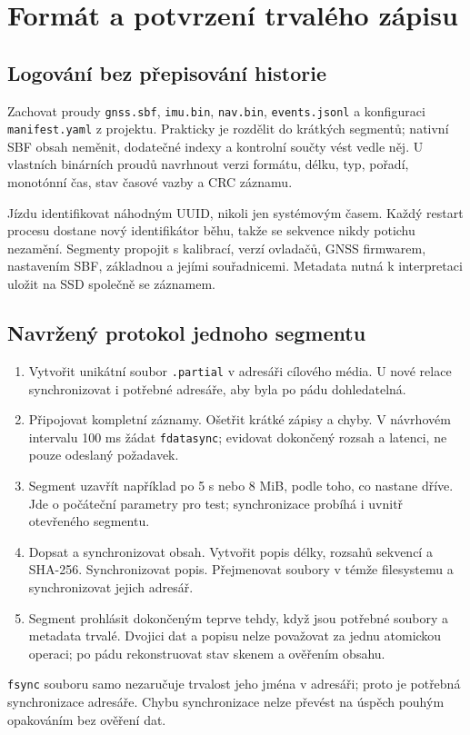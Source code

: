 \documentclass[11pt,a4paper]{article}
\newcommand{\novastrana}{\clearpage}
\begin{document}
\novastrana
\section{Formát a potvrzení trvalého zápisu}
\subsection{Logování bez přepisování historie}
Zachovat proudy \texttt{gnss.sbf}, \texttt{imu.bin}, \texttt{nav.bin}, \texttt{events.jsonl} a konfiguraci \texttt{manifest.yaml} z projektu. Prakticky je rozdělit do krátkých segmentů; nativní SBF obsah neměnit, dodatečné indexy a kontrolní součty vést vedle něj. U vlastních binárních proudů navrhnout verzi formátu, délku, typ, pořadí, monotónní čas, stav časové vazby a CRC záznamu.\cite{projekt}

Jízdu identifikovat náhodným UUID, nikoli jen systémovým časem. Každý restart procesu dostane nový identifikátor běhu, takže se sekvence nikdy potichu nezamění. Segmenty propojit s kalibrací, verzí ovladačů, GNSS firmwarem, nastavením SBF, základnou a jejími souřadnicemi. Metadata nutná k interpretaci uložit na SSD společně se záznamem.

\subsection{Navržený protokol jednoho segmentu}
\begin{enumerate}
\item Vytvořit unikátní soubor \texttt{.partial} v adresáři cílového média. U nové relace synchronizovat i potřebné adresáře, aby byla po pádu dohledatelná.
\item Připojovat kompletní záznamy. Ošetřit krátké zápisy a chyby. V návrhovém intervalu 100 ms žádat \texttt{fdatasync}; evidovat dokončený rozsah a latenci, ne pouze odeslaný požadavek.
\item Segment uzavřít například po 5 s nebo 8 MiB, podle toho, co nastane dříve. Jde o počáteční parametry pro test; synchronizace probíhá i uvnitř otevřeného segmentu.
\item Dopsat a synchronizovat obsah. Vytvořit popis délky, rozsahů sekvencí a SHA-256. Synchronizovat popis. Přejmenovat soubory v témže filesystemu a synchronizovat jejich adresář.
\item Segment prohlásit dokončeným teprve tehdy, když jsou potřebné soubory a metadata trvalé. Dvojici dat a popisu nelze považovat za jednu atomickou operaci; po pádu rekonstruovat stav skenem a ověřením obsahu.
\end{enumerate}
\texttt{fsync} souboru samo nezaručuje trvalost jeho jména v adresáři; proto je potřebná synchronizace adresáře. Chybu synchronizace nelze převést na úspěch pouhým opakováním bez ověření dat.\cite{fsync}
\end{document}
